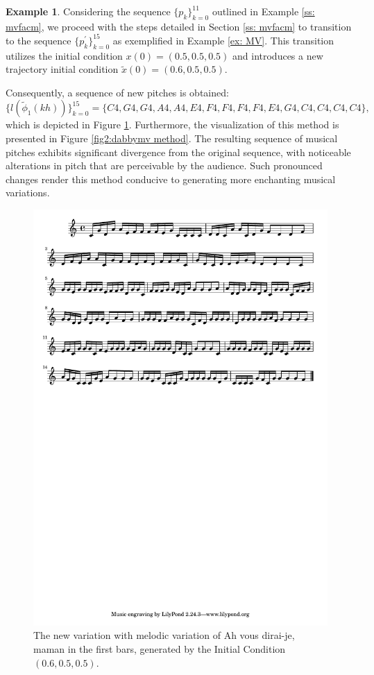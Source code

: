 \documentclass[11pt]{article}
\theoremstyle{definition}
\newtheorem{example}[theorem]{Example}
\begin{document}
\begin{example}
Considering the sequence $\{p_k\}_{k=0}^{11}$ outlined in Example \ref{ss: mvfacm}, we proceed with the steps detailed in Section \ref{ss: mvfacm} to transition to the sequence $\{p^\prime_k\}_{k=0}^{15}$ as exemplified in Example \ref{ex: MV}. 
This transition utilizes the initial condition $x(0) = (0.5,0.5,0.5)$ and introduces a new trajectory initial condition $\tilde{x}(0) = (0.6,0.5,0.5)$.

Consequently, a sequence of new pitches is obtained:
\[ \{l(\tilde{\phi}_1(kh))\}_{k = 0}^{15} = \{C4, G4, G4, A4, A4, E4, F4, F4, F4, F4, E4, G4, C4, C4, C4, C4 \}, \]
which is depicted in Figure \ref{fig:DabbyER}. Furthermore, the visualization of this method is presented in Figure \ref{fig2:dabbymv method}. 
The resulting sequence of musical pitches exhibits significant divergence from the original sequence, with noticeable alterations in pitch that are perceivable by the audience. 
Such pronounced changes render this method conducive to generating more enchanting musical variations.
\end{example}

\begin{figure}
\centering
\includegraphics[trim=1cm 27.5cm 8.65cm 0.5cm, clip, scale=0.8]{dabby_melody_variation.pdf}
\caption{The new variation with melodic variation of Ah vous dirai-je, maman in the first bars, generated by the Initial Condition $(0.6, 0.5, 0.5)$.} 
\label{fig:DabbyER}
\end{figure}
\end{document}
